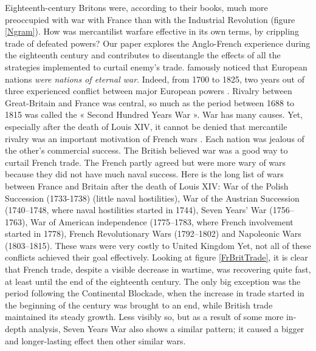 \documentclass[12pt,a4paper,notitlepage,english]{article}
\begin{document}
Eighteenth-century Britons were, according to their books, much more preoccupied with war with France than with the Industrial Revolution (figure \ref{Ngram}).
How was mercantilist warfare \citep{Conti2017} effective in its own terms, by crippling trade of defeated powers? Our paper explores the Anglo-French experience during the eighteenth century and contributes to disentangle the effects of all the  
strategies implemented to curtail enemy's trade.
\cite{Jefferson1823} famously noticed that European nations \textit{were nations of eternal war}. Indeed, from 1700 to 1825, two years out of three experienced conflict between major European powers \citep{Roser2016}. Rivalry between Great-Britain and France was central, so much as the period between 1688 to 1815 was called the « Second Hundred Years War ». War has many causes. Yet, especially after the death of Louis XIV, it cannot be denied that mercantile rivalry was an important motivation of French wars \citep{Wallerstein1980,Tracy1991,Brewer2002,Davis2006,Crouzet2008}. Each nation was jealous of the other's commercial success. The British believed war was a good way to curtail French trade. The French partly agreed but were more wary of wars because they did not have much naval success.
Here is the long list of wars between France and Britain after the death of Louis XIV: War of the Polish Succession (1733-1738) (little naval hostilities), War of the Austrian Succession (1740–1748, where naval hostilities started in 1744), Seven Years' War (1756–1763), War of American independence (1775–1783, where French involvement started in 1778), French Revolutionary Wars (1792–1802) and Napoleonic Wars (1803–1815).
These wars were very costly to United Kingdom \citep{Baugh1965,Neal1977,Brewer2002}
Yet, not all of these conflicts achieved their goal effectively.
Looking at figure \ref{FrBritTrade}, it is clear that French trade, despite a visible decrease in wartime, was recovering quite fast, at least until the end of the eighteenth century.
The only big exception was the period following the Continental Blockade, when the increase in trade started in the beginning of the century was brought to an end, while British trade maintained its steady growth.
Less visibly so, but as a result of some more in-depth analysis, Seven Years War also shows a similar pattern; it caused a bigger and longer-lasting effect then other similar wars.
\end{document}

